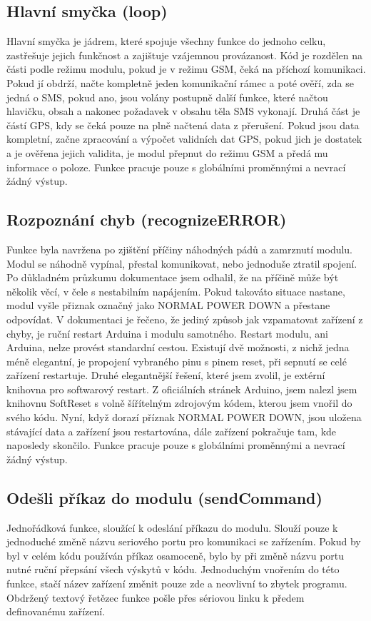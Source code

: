 \documentclass[FM,BP]{tulthesis}  %
\begin{document}
\subsection{Hlavní smyčka (loop)}
Hlavní smyčka je jádrem, které spojuje všechny funkce do jednoho celku, zastřešuje jejich funkčnost a zajištuje vzájemnou provázanost. Kód je rozdělen na části podle režimu modulu, pokud je v režimu GSM, čeká na příchozí komunikaci. Pokud jí obdrží, načte kompletně jeden komunikační rámec a poté ověří, zda se jedná o SMS, pokud ano, jsou volány postupně další funkce, které načtou hlavičku, obsah a nakonec požadavek v obsahu těla SMS vykonají. Druhá část je částí GPS, kdy se čeká pouze na plně načtená data z přerušení. Pokud jsou data kompletní, začne zpracování a výpočet validních dat GPS, pokud jich je dostatek a je ověřena jejich validita, je modul přepnut do režimu GSM a předá mu informace o poloze. Funkce pracuje pouze s globálními proměnnými a nevrací žádný výstup.

\subsection{Rozpoznání chyb (recognizeERROR)}
Funkce byla navržena po zjištění příčiny náhodných pádů a zamrznutí modulu. Modul se náhodně vypínal, přestal komunikovat, nebo jednoduše ztratil spojení. Po důkladném průzkumu dokumentace \cite{ROBOT SW} jsem odhalil, že na příčině může být několik věcí, v čele s nestabilním napájením. Pokud takováto situace nastane, modul vyšle přiznak označný jako NORMAL POWER DOWN a přestane odpovídat. V dokumentaci je řečeno, že jediný způsob jak vzpamatovat zařízení z chyby, je ruční restart Arduina i modulu samotného. Restart modulu, ani Arduina, nelze provést standardní cestou. Existují dvě možnosti, z nichž jedna méně elegantní, je propojení vybraného pinu s pinem reset, při sepnutí se celé zařízení restartuje. Druhé elegantnější řešení, které jsem zvolil, je extérní knihovna pro softwarový restart. Z oficiálních stránek Arduino, jsem nalezl jsem knihovnu SoftReset \cite{SoftReset} s volně šířítelným zdrojovým kódem, kterou jsem vnořil do svého kódu. Nyní, když dorazí příznak NORMAL POWER DOWN, jsou uložena stávající data a zařízení jsou restartována, dále zařízení pokračuje tam, kde naposledy skončilo. Funkce pracuje pouze s globálními proměnnými a nevrací žádný výstup.

\subsection{Odešli příkaz do modulu (sendCommand)}
Jednořádková funkce, sloužící k odeslání příkazu do modulu. Slouží pouze k jednoduché změně názvu seriového portu pro komunikaci se zařízením. Pokud by byl v celém kódu používán příkaz osamoceně, bylo by při změně názvu portu nutné ruční přepsání všech výskytů v kódu. Jednoduchým vnořením do této funkce, stačí název zařízení změnit pouze zde a neovlivní to zbytek programu. Obdržený textový řetězec funkce pošle přes sériovou linku k předem definovanému zařízení.
\end{document}
